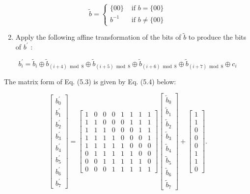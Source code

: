 \[
\tilde{b}= \begin{cases}\{00\} & \text { if } b=\{00\} \\ b^{-1} & \text { if } b \neq\{00\}\end{cases}
\]

\begin{enumerate}
  \setcounter{enumi}{1}
  \item Apply the following affine transformation of the bits of \(\tilde{b}\) to produce the bits of \(b^{\prime}\) :
\end{enumerate}

\[
b_{i}^{\prime}=\tilde{b}_{i} \oplus \tilde{b}_{(i+4) \bmod 8} \oplus \tilde{b}_{(i+5) \bmod 8} \oplus \tilde{b}_{(i+6) \bmod 8} \oplus \tilde{b}_{(i+7) \bmod 8} \oplus c_{i}
\]

The matrix form of Eq. (5.3) is given by Eq. (5.4) below:

\[
\left[\begin{array}{l}
b_{0}^{\prime} \\
b_{1}^{\prime} \\
b_{2}^{\prime} \\
b_{3}^{\prime} \\
b_{4}^{\prime} \\
b_{5}^{\prime} \\
b_{6}^{\prime} \\
b_{7}^{\prime}
\end{array}\right]=\left[\begin{array}{llllllll}
1 & 0 & 0 & 0 & 1 & 1 & 1 & 1 \\
1 & 1 & 0 & 0 & 0 & 1 & 1 & 1 \\
1 & 1 & 1 & 0 & 0 & 0 & 1 & 1 \\
1 & 1 & 1 & 1 & 0 & 0 & 0 & 1 \\
1 & 1 & 1 & 1 & 1 & 0 & 0 & 0 \\
0 & 1 & 1 & 1 & 1 & 1 & 0 & 0 \\
0 & 0 & 1 & 1 & 1 & 1 & 1 & 0 \\
0 & 0 & 0 & 1 & 1 & 1 & 1 & 1
\end{array}\right]\left[\begin{array}{c}
\tilde{b}_{0} \\
\tilde{b}_{1} \\
\tilde{b}_{2} \\
\tilde{b}_{3} \\
\tilde{b}_{4} \\
\tilde{b}_{5} \\
\tilde{b}_{6} \\
\tilde{b}_{7}
\end{array}\right]+\left[\begin{array}{l}
1 \\
1 \\
0 \\
0 \\
0 \\
1 \\
1 \\
0
\end{array}\right] .
\]

